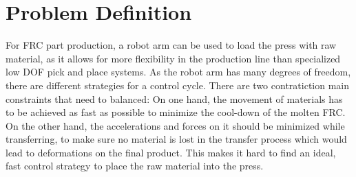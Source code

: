 \section{Problem Definition}

For \ac{FRC} part production, a robot arm can be used to load the press with raw material, as it allows for more flexibility in the production line than specialized low DOF pick and place systems.
As the robot arm has many degrees of freedom, there are different strategies for a control cycle. 
There are two contratiction main constraints that need to balanced:
On one hand, the movement of materials has to be achieved as fast as possible to minimize the cool-down of the molten \ac{FRC}. 
On the other hand, the accelerations and forces on it should be minimized while transferring, to make sure no material is lost in the transfer process which would lead to deformations on the final product.
This makes it hard to find an ideal, fast control strategy to place the raw material into the press.
\medskip

